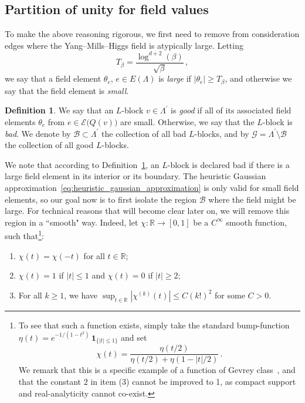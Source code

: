 \documentclass[11pt]{article}
\theoremstyle{definition}
\newtheorem{definition}[theorem]{Definition}
\theoremstyle{remark}
\numberwithin{theorem}{section}
\def\La{{\Lambda}}
\newcommand{\bR}{\mathbb R}
\newcommand{\cE}{\mathcal{E}}
\newcommand{\cB}{\mathcal B}
\newcommand{\one}{\boldsymbol{1}}
\begin{document}
    \subsection{Partition of unity for field values}\label{subsection:partition_of_unity}
    To make the above reasoning rigorous, we first need to remove from consideration edges where the Yang--Mills--Higgs field is atypically large. Letting 
    \begin{equation}
        \label{eq:def_of_T_beta}
        T_\beta = \frac{\log^{d+2}(\beta)}{\sqrt{\beta}} \, ,
    \end{equation}
    we say that a field element $\theta_e$, $e\in E(\Lambda)$ is \emph{large} if $|\theta_e| \ge T_\beta$, and otherwise we say that the field element is \emph{small}. 
    \begin{definition}
        \label{def:good_and_bad_blocks}
        We say that an $L$-block $v\in \La^\prime$ is \emph{good} if all of its associated field elements $\theta_e$ from $e\in \cE\big(Q(v)\big)$ are small. 
        Otherwise, we say that the $L$-block is \emph{bad}. We denote by $\cB\subset \La^\prime$ the collection of all bad $L$-blocks, and by $\mathcal{G} = \La^\prime\setminus \cB$ the collection of all good $L$-blocks. 
    \end{definition}
    \noindent
    We note that according to Definition~\ref{def:good_and_bad_blocks}, an $L$-block is declared bad if there is a large field element in its interior or its boundary. The heuristic Gaussian approximation~\eqref{eq:heuristic_gaussian_approximation}  is only valid for small field elements, so our goal now is to first isolate the region $\cB$ where the field might be large. For technical reasons that will become clear later on, we will remove this region in a ``smooth" way. Indeed, let $\chi:\bR\to [0,1]$ be a $C^\infty$ smooth function, such that\footnote{To see that such a function exists, simply take the standard bump-function $\eta(t) = e^{-1/(1-t^2)} \, \one_{\{|t|\le 1\}}$ and set $$\chi(t) = \frac{\eta(t/2)}{\eta(t/2) + \eta(1-|t|/2)}\, .$$ We remark that this is a specific example of a function of Gevrey class~\cite{Hormander-PDEI}, and that the constant $2$ in item (3) cannot be improved to 1, as compact support and real-analyticity cannot co-exist.}:
    \begin{enumerate}
        \item[(1)] $\chi(t) = \chi(-t)$ for all $t\in \bR$;
        \item[(2)] $\chi(t) = 1$ if $|t|\le 1$ and $\chi(t) = 0$ if $|t|\ge 2$; 
        \item[(3)] For all $k\ge 1$, we have $\displaystyle \sup_{t\in \bR} |\chi^{(k)}(t)| \le C (k!)^{2}$ for some $C>0$. 
    \end{enumerate}
\end{document}
